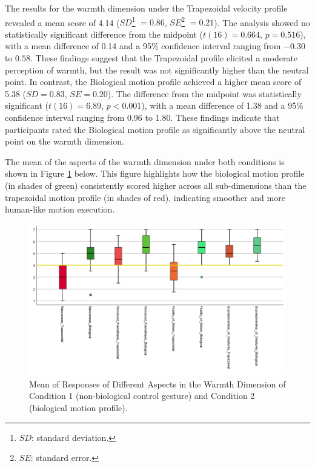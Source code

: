 \documentclass{CSSRforAfrica}
\begin{document}
The results for the warmth dimension under the Trapezoidal velocity profile revealed a mean score of 4.14 ($SD$\footnote{$SD$: standard deviation.} $= 0.86$, $SE$\footnote{$SE$: standard error.} $ = 0.21$). The analysis showed no statistically significant difference from the midpoint ($t(16) = 0.664$, $p = 0.516$), with a mean difference of 0.14 and a 95\% confidence interval ranging from $-0.30$ to $0.58$. These findings suggest that the Trapezoidal profile elicited a moderate perception of warmth, but the result was not significantly higher than the neutral point.
In contrast, the Biological motion profile achieved a higher mean score of 5.38 ($SD = 0.83$, $SE = 0.20$). The difference from the midpoint was statistically significant ($t(16) = 6.89$, $p < 0.001$), with a mean difference of 1.38 and a 95\% confidence interval ranging from 0.96 to 1.80.  These findings indicate that participants rated the Biological motion profile as significantly above the neutral point on the warmth dimension.

The mean of the aspects of the warmth dimension under both conditions is shown in Figure \ref{figure:Warmth_means} below. This figure highlights how the biological motion profile  (in shades of green) consistently scored higher across all sub-dimensions than the trapezoidal motion profile (in shades of red), indicating smoother and more human-like motion execution.
\begin{figure}[t]
  \centering \includegraphics[scale=0.45]{Warmth_Means.png}
  \caption{Mean of Responses of Different Aspects in the Warmth Dimension of  Condition 1 (non-biological control gesture) and Condition 2 (biological motion profile).}
  \label{figure:Warmth_means}
\end{figure}
\end{document}
